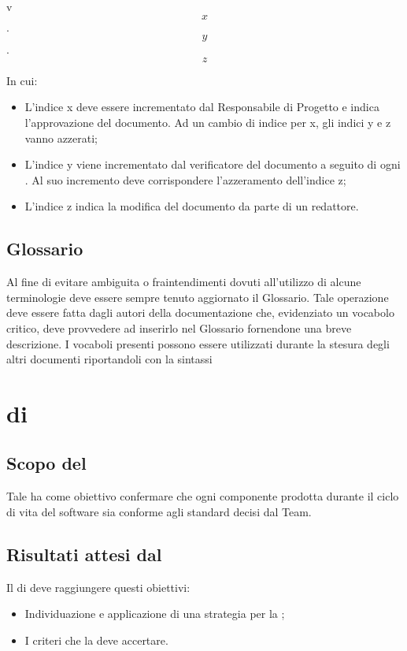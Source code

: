 \begin{center}
  v \[x\].\[y\].\[z\]
\end{center}

In cui:
\begin{itemize}
\item L'indice x deve essere incrementato dal Responsabile di Progetto e indica l'approvazione del documento. Ad un cambio di indice per x, gli indici y e z vanno azzerati;
\item L'indice y viene incrementato dal verificatore del documento a seguito di ogni . Al suo incremento deve corrispondere l'azzeramento dell'indice z;
\item L'indice z indica la modifica del documento da parte di un redattore.
\end{itemize}

\subsection{Glossario}
Al fine di evitare ambiguita o fraintendimenti dovuti all'utilizzo di alcune terminologie deve essere sempre tenuto aggiornato il Glossario. Tale operazione deve essere fatta dagli autori della documentazione che, evidenziato un vocabolo critico, deve provvedere ad inserirlo nel Glossario fornendone una breve descrizione. I vocaboli presenti possono essere utilizzati durante la stesura degli altri documenti riportandoli con la sintassi 

\section{ di }
\subsection{Scopo del }
Tale  ha come obiettivo confermare che ogni componente prodotta durante il ciclo di vita del software sia conforme agli standard decisi dal Team.
\subsection{Risultati attesi dal }
Il  di  deve raggiungere questi obiettivi:
\begin{itemize}
\item Individuazione e applicazione di una strategia per la ;
\item I criteri che la  deve accertare.
\end{itemize}

